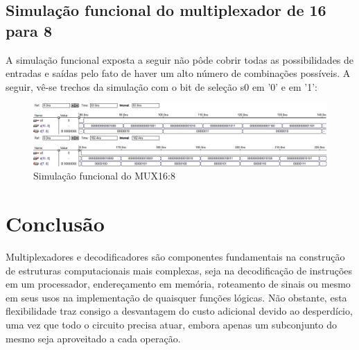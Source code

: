 \documentclass[a4paper]{article}
\begin{document}
\FloatBarrier

\subsection{Simulação funcional do multiplexador de 16 para 8}

	A simulação funcional exposta a seguir não pôde cobrir todas as
possibilidades de entradas e saídas pelo fato de haver um alto número de
combinações possíveis. A seguir, vê-se trechos da simulação com o bit de
seleção s0 em '0' e em '1':
\begin{figure}[h]
  \centering
  \includegraphics[scale=0.45]{mux_16-8_simulacao1.jpg}
  \caption{Simulação funcional do MUX16:8}
\end{figure}



\FloatBarrier

\section{Conclusão}

Multiplexadores e decodificadores são componentes fundamentais na construção de
estruturas computacionais mais complexas, seja na decodificação de instruções
em um processador, endereçamento em memória, roteamento de sinais ou mesmo em
seus usos na implementação de quaisquer funções lógicas. Não obstante, esta
flexibilidade traz consigo a desvantagem do custo adicional devido ao
desperdício, uma vez que todo o circuito precisa atuar, embora apenas um
subconjunto do mesmo seja aproveitado a cada operação.
\end{document}
